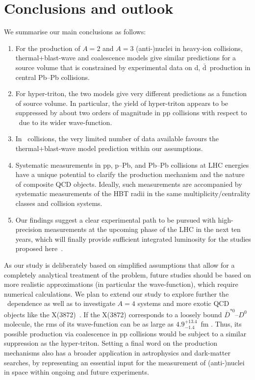 \documentclass[%
 reprint,
 amsmath,amssymb,
 aps,
]{revtex4-1}
\begin{document}
\section{Conclusions and outlook}
We summarise our main conclusions as follows:
\begin{enumerate}
	\item For the production of $A=2$ and $A=3$ \mbox{(anti-)nuclei} in heavy-ion collisions, thermal+blast-wave and coalescence models give similar predictions for a source volume that is constrained by experimental data on d, $\bar{\mathrm{d}}$~production in central Pb--Pb collisions.
	\item For hyper-triton, the two models give very different predictions as a function of source volume. In particular, the yield of hyper-triton appears to be suppressed by about two orders of magnitude in pp collisions with respect to \hethree~due to its wider wave-function. 
	\item In \PbPb~collisions, the very limited number of data available favours the thermal+blast-wave model prediction within our assumptions.
	\item Systematic measurements in pp, p--Pb, and Pb--Pb collisions at LHC energies have a unique potential to clarify the production mechanism and the nature of composite QCD objects. Ideally, such measurements are accompanied by systematic measurements of the HBT radii in the same multiplicity/centrality classes and collision systems.
	\item Our findings suggest a clear experimental path to be pursued with high-precision measurements at the upcoming phase of the LHC in the next ten years, which will finally provide sufficient integrated luminosity for the studies proposed here~\cite{Citron:2018lsq}.

\end{enumerate}
As our study is deliberately based on simplified assumptions that allow for a completely analytical treatment of the problem, future studies should be based on more realistic approximations (in particular the wave-function), which require numerical calculations. 
We plan to extend our study to explore further the \pt~dependence as well as to investigate $A=4$ systems and more exotic QCD objects like the X(3872)~\cite{Esposito:2015fsa, Cho:2017dcy}. 
If the X(3872) corresponds to a loosely bound $\overline{D}^{*0}$--$D^{0}$ molecule, the rms of its wave-function can be as large as $4.9^{+13.4}_{-1.4}$~fm \cite{Artoisenet:2010uu}. Thus, its possible production via coalescence in pp collisions would be subject to a similar suppression as the hyper-triton. 
Setting a final word on the production mechanisms also has a broader application in astrophysics and dark-matter searches, by representing an essential input for the measurement of (anti-)nuclei in space within ongoing \cite{Alcaraz:2000ss, Poulin:2018wzu} and future \cite{AMS100, Aramaki:2015laa} experiments. 
\end{document}
